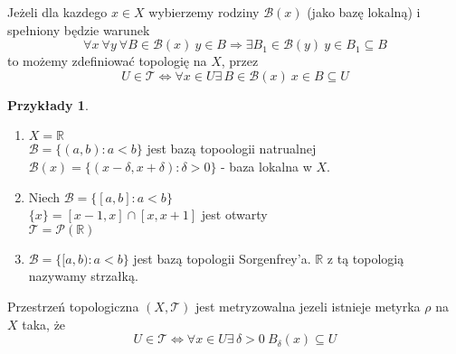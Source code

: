 \documentclass[twoside,10pt]{article}
\theoremstyle{definition}
\theoremstyle{definition}
\theoremstyle{definition}
\theoremstyle{definition}
\theoremstyle{remark}
\theoremstyle{definition}
\theoremstyle{definition}
\theoremstyle{definition}
\theoremstyle{definition}
\theoremstyle{definition}
\newtheorem*{przy}{Przykłady}
\theoremstyle{definition}
\begin{document}
\begin{tw} 
    Jeżeli dla kazdego $x \in X$  wybierzemy rodziny $\mathcal B(x)$ (jako bazę lokalną)
    i spełniony będzie warunek 
    \[ \forall x \ \forall y \ \forall B \in \mathcal B(x) \ y \in B \Rightarrow 
    \exists B_1 \in \mathcal B(y) \ y \in B_1 \subseteq B \]
    to możemy zdefiniować topologię na $X$, przez 
    \[ U \in \mathcal T \Leftrightarrow \forall x \in U \exists \, B \in \mathcal B(x) \ x \in B \subseteq U \]
\end{tw} 
\begin{przy} \hfill
    \begin{enumerate}[(1)]
        \item $X = \mathbb R$ \\ 
            $\mathcal B = \{ (a,b): a < b \}$ jest bazą topoologii natrualnej \\ 
            $\mathcal B(x) = \{(x-\delta,x+\delta): \delta > 0 \}$ - baza lokalna w $X$.
        \item Niech $\mathcal B = \{[a,b]: a < b \}$ \\ 
            $\{ x\} = [x-1,x]\cap[x,x+1]$ jest otwarty \\ 
            $\mathcal T = \mathcal P (\mathbb R)$
        \item $\mathcal B = \{[a,b): a < b\}$ jest bazą topologii Sorgenfrey'a. $\mathbb R$ z tą 
            topologią nazywamy strzałką.
    \end{enumerate} 
\end{przy} 
\begin{df} 
    Przestrzeń topologiczna $(X,\mathcal T)$ jest metryzowalna jezeli istnieje metyrka $\rho$ na $X$ taka, że
    \[ U \in \mathcal T \Leftrightarrow \forall x \in U \exists \, \delta > 0 \ B_\delta (x) \subseteq U \]
\end{df} 
\end{document}

